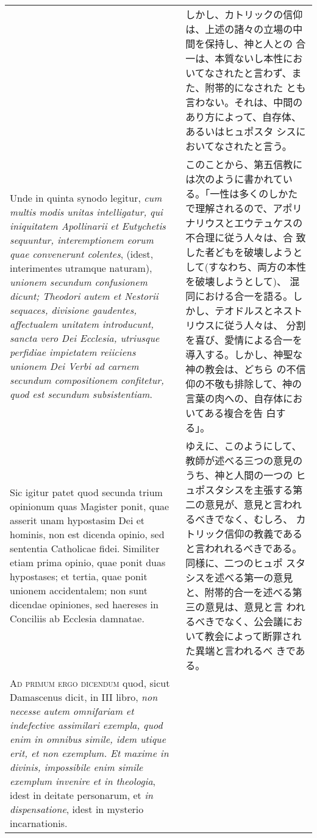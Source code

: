 \documentclass[10pt]{jsarticle} %
\begin{document}
\begin{longtable}{p{21em}p{21em}}
&

しかし、カトリックの信仰は、上述の諸々の立場の中間を保持し、神と人との
合一は、本質ないし本性においてなされたと言わず、また、附帯的になされた
とも言わない。それは、中間のあり方によって、自存体、あるいはヒュポスタ
シスにおいてなされたと言う。

\\

Unde in quinta synodo legitur, {\itshape cum multis modis unitas
intelligatur, qui iniquitatem Apollinarii et Eutychetis sequuntur,
interemptionem eorum quae convenerunt colentes}, (idest, interimentes
utramque naturam), {\itshape unionem secundum confusionem dicunt;
Theodori autem et Nestorii sequaces, divisione gaudentes, affectualem
unitatem introducunt, sancta vero Dei Ecclesia, utriusque perfidiae
impietatem reiiciens unionem Dei Verbi ad carnem secundum
compositionem confitetur, quod est secundum subsistentiam}.

&

このことから、第五信教には次のように書かれている。「一性は多くのしかた
で理解されるので、アポリナリウスとエウテュケスの不合理に従う人々は、合
致した者どもを破壊しようとして(すなわち、両方の本性を破壊しようとして)、
混同における合一を語る。しかし、テオドルスとネストリウスに従う人々は、
分割を喜び、愛情による合一を導入する。しかし、神聖な神の教会は、どちら
の不信仰の不敬も排除して、神の言葉の肉への、自存体においてある複合を告
白する」。


\\


Sic igitur patet quod secunda trium opinionum quas Magister ponit,
quae asserit unam hypostasim Dei et hominis, non est dicenda opinio,
sed sententia Catholicae fidei.  Similiter etiam prima opinio, quae
ponit duas hypostases; et tertia, quae ponit unionem accidentalem; non
sunt dicendae opiniones, sed haereses in Conciliis ab Ecclesia
damnatae.


&

ゆえに、このようにして、教師が述べる三つの意見のうち、神と人間の一つの
ヒュポスタシスを主張する第二の意見が、意見と言われるべきでなく、むしろ、
カトリック信仰の教義であると言われれるべきである。同様に、二つのヒュポ
スタシスを述べる第一の意見と、附帯的合一を述べる第三の意見は、意見と言
われるべきでなく、公会議において教会によって断罪された異端と言われるべ
きである。


\\



{\scshape Ad primum ergo dicendum} quod, sicut Damascenus dicit, in
III libro, {\itshape non necesse autem omnifariam et indefective
assimilari exempla, quod enim in omnibus simile, idem utique erit, et
non exemplum. Et maxime in divinis, impossibile enim simile exemplum
invenire et in theologia}, idest in deitate personarum, et {\itshape
in dispensatione}, idest in mysterio incarnationis.




\end{longtable}
\end{document}
